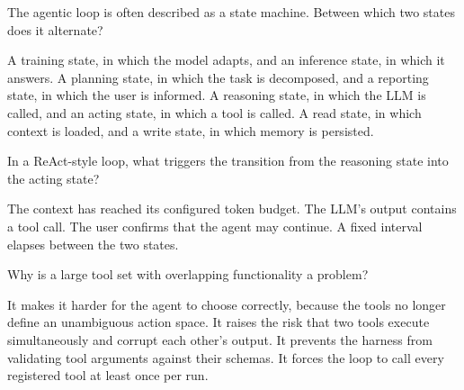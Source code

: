 
\qitem The agentic loop is often described as a state machine. Between which two states does it
alternate?
\begin{choices}
  \choice A training state, in which the model adapts, and an inference state, in which it answers.
  \choice A planning state, in which the task is decomposed, and a reporting state, in which the user is informed.
  \CorrectChoice A reasoning state, in which the LLM is called, and an acting state, in which a tool is called.
  \choice A read state, in which context is loaded, and a write state, in which memory is persisted.
\end{choices}
\dontknow
{}

\qitem In a ReAct-style loop, what triggers the transition from the reasoning state into the acting
state?
\begin{choices}
  \choice The context has reached its configured token budget.
  \CorrectChoice The LLM's output contains a tool call.
  \choice The user confirms that the agent may continue.
  \choice A fixed interval elapses between the two states.
\end{choices}
\dontknow
{}



\qitem Why is a large tool set with overlapping functionality a problem?
\begin{choices}
  \CorrectChoice It makes it harder for the agent to choose correctly, because the tools no longer define an unambiguous action space.
  \choice It raises the risk that two tools execute simultaneously and corrupt each other's output.
  \choice It prevents the harness from validating tool arguments against their schemas.
  \choice It forces the loop to call every registered tool at least once per run.
\end{choices}
\dontknow
{}

